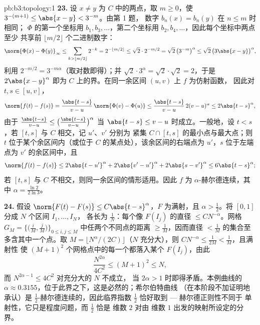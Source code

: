 \begin{solution}{pb:b3:topology:1}
\textbf{23.} 设 $x \neq y$ 为 $C$ 中的两点，取 $m \geq 0$，使
$3^{-(m+1)} \leq \abs{x - y} < 3^{-m}$。由第 1 题，
数字 $b_n(x) = b_n(y)$ 在 $n \leq m$ 时相同；
$\Phi$ 的第一个坐标用 $b_1, b_3, \dots$，第二个坐标用 $b_2,
b_4, \dots$，因此每个坐标中两点至少
共享前 $\lfloor m/2\rfloor$ 个二进制数字：
\[
\norm{\Phi(x) - \Phi(y)}_\infty
\leq \sum_{k > \lfloor m/2\rfloor}2^{-k}
= 2^{-\lfloor m/2\rfloor} \leq \sqrt2\cdot2^{-m/2}
= \sqrt2\,\bigl(3^{-m}\bigr)^\alpha
\leq \sqrt2\,\bigl(3\abs{x-y}\bigr)^\alpha,
\]
利用 $2^{-m/2} = 3^{-m\alpha}$（取对数即得）；并
$\sqrt2\cdot3^\alpha = \sqrt2\cdot\sqrt2 = 2$，于是
$2\abs{x-y}^\alpha$ 即为 $C$ 上的界。在同一余区间 $(u, v)$ 上 $f$ 为仿射函数，
因此对 $t, s \in [u, v]$，
\[
\norm{f(t) - f(s)} = \frac{\abs{t-s}}{v-u}\,
\norm{\Phi(v) - \Phi(u)}
\leq \frac{\abs{t-s}}{v-u}\,2(v-u)^\alpha
\leq 2\abs{t-s}^\alpha,
\]
由于 $\frac{\abs{t-s}}{v-u} \leq \bigl(\frac{\abs{t-s}}
{v-u}\bigr)^\alpha$ 当 $\abs{t-s} \leq v - u$ 时成立。一般地，设 $t <
s$，若 $[t, s]$ 与 $C$ 相交，记 $u'$、$v'$ 分别为
紧集 $C \cap [t, s]$ 的最小点与最大点；则 $t$
位于某个余区间内（或位于 $C$ 的某点处），该余区间的右端点为
$u'$，$s$ 位于左端点为 $v'$ 的余区间中，且
\[
\norm{f(t) - f(s)} \leq 2\abs{t - u'}^\alpha
+ 2\abs{v' - u'}^\alpha + 2\abs{s - v'}^\alpha
\leq 6\abs{t - s}^\alpha ;
\]
若 $[t, s]$ 与 $C$ 不相交，则同一余区间的情形适用。因此 $f$ 为
$\alpha$-赫尔德连续，其中 $\alpha = \frac{\ln2}{2\ln3}$。

\textbf{24.} 假设 $\norm{F(t) - F(s)} \leq
C\abs{t-s}^\alpha$，$F$ 为满射，且 $\alpha >
\frac12$。将 $[0,1]$ 分成 $N$ 个区间 $I_1, \dots, I_N$，
各长为 $\frac1N$：每个像 $F(I_j)$ 的直径 $\leq
CN^{-\alpha}$。网格 $G_M =
\bigl\{\bigl(\frac iM, \frac jM\bigr)\bigr\}_{0 \leq i, j
\leq M}$ 中任两个不同点的距离 $\geq \frac1M$，因而直径
$< \frac1M$ 的集合至多含其中一个点。取 $M =
\lfloor N^\alpha/(2C)\rfloor$（$N$ 充分大），则
$CN^{-\alpha} \leq \frac1{2M} < \frac1M$，且满射性
使 $(M+1)^2$ 个网格点中的每一个都落入某个
$F(I_j)$，由此
\[
\frac{N^{2\alpha}}{4C^2} \leq (M + 1)^2 \leq N,
\]
而 $N^{2\alpha - 1} \leq 4C^2$ 对充分大的 $N$ 不成立，
当 $2\alpha > 1$ 时即得矛盾。本例曲线的 $\alpha \approx
0.3155$，位于此界之下，这是必然的；希尔伯特曲线
（在本阶段不加证明地承认）是 $\frac12$-赫尔德连续的，因此临界指数
$\frac12$ 恰好取到 --- 赫尔德正则性不同于
单射性，它只是程度问题，而 $\frac12$ 恰是
维数 $2$ 对由
维数 $1$ 出发的映射所设定的分界。


\end{solution}
